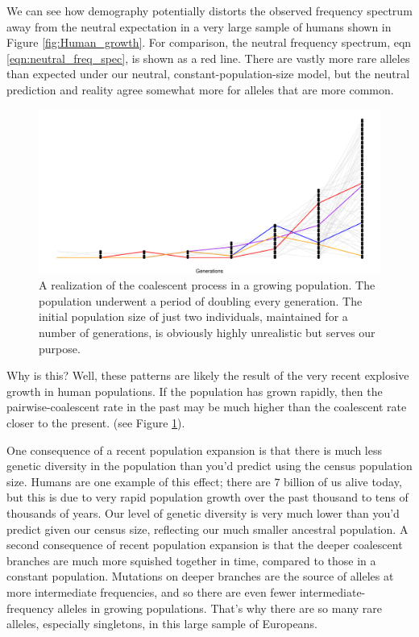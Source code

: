 We can see how demography potentially distorts the observed frequency spectrum away from the neutral expectation in a very large sample of humans shown in Figure \ref{fig:Human_growth}. For
comparison, the neutral frequency spectrum, eqn
\eqref{eqn:neutral_freq_spec}, is shown as a red line. There are
  vastly more rare alleles than expected under our neutral, constant-population-size model, but the neutral prediction and reality agree somewhat more for alleles that are more common.  

\begin{figure}
\begin{center}
  \includegraphics[width = \textwidth]{figures/Genetic_drift/Demography/Growth_genealogy.pdf}
\end{center}
\caption{A realization of the coalescent process in a growing population. The population underwent a period of doubling every generation. The initial population size of just two individuals, maintained for a number of generations, is obviously highly unrealistic but serves our purpose.} \label{fig:Genealogy_growth}
\end{figure}

Why is this? Well, these patterns are likely the result of the very recent
explosive growth in human populations. If the population has grown rapidly, then the pairwise-coalescent rate in the past may be much higher than the coalescent rate closer to the present. (see Figure \ref{fig:Genealogy_growth}). 

One consequence of a recent population expansion is that there is much less genetic diversity in the population than you'd predict using the census
population size. Humans are one example of this effect; there are $7$ billion
of us alive today, but this is due to very rapid population growth
over the past thousand to tens of thousands of years. Our level of
genetic diversity is very much lower than you'd predict given our
census size, reflecting our much smaller ancestral population. A second consequence of recent population expansion is that the deeper coalescent branches are much more squished together in time, compared to those in a constant population.  Mutations on deeper branches are the source of alleles at more intermediate frequencies, and so there are even fewer intermediate-frequency alleles
in growing populations. That's why there are so many rare alleles,
especially singletons, in this large sample of Europeans. 


